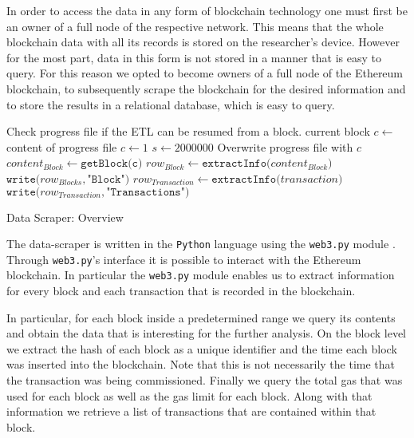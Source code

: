 In order to access the data in any form of blockchain technology one must first be an owner of a full node of the respective network. This means that the whole blockchain data with all its records is stored on the researcher's device. However for the most part, data in this form is not stored in a manner that is easy to query. For this reason we opted to become owners of a full node of the Ethereum blockchain, to subsequently scrape the blockchain for the desired information and to store the results in a relational database, which is easy to query.


\begin{algorithm}[h]
\label{etl}
\begin{algorithmic}
\State Check progress file if the ETL can be resumed from a block.
    \State current block $c \gets$ content of progress file
\Else
    \State $c \gets 1$
\EndIf
\State $s \gets 2000000$ 
   \State Overwrite progress file with $c$ 
   \State $content_{Block} \gets \texttt{getBlock(c)}$
   \State $row_{Block} \gets \texttt{extractInfo(}content_{Block}\texttt{)}$
   \State $\texttt{write(} row_{Blocks}, \texttt{"Block")}$
       \State $row_{Transaction} \gets \texttt{extractInfo(}transaction\texttt{)}$
       \State $\texttt{write(} row_{Transaction}, \texttt{"Transactions")}$
   \EndFor
\EndWhile
\end{algorithmic}
\caption{Data Scraper: Overview}
\end{algorithm}


The data-scraper is written in the \texttt{Python} language using the \texttt{web3.py} module \cite{Python, web3}. Through \texttt{web3.py}'s interface it is possible to interact with the Ethereum blockchain. In particular the \texttt{web3.py} module enables us to extract information for every block and each transaction that is recorded in the blockchain.

In particular, for each block inside a predetermined range we query its contents and obtain the data that is interesting for the further analysis. On the block level we extract the hash of each block as a unique identifier and the time each block was inserted into the blockchain. Note that this is not necessarily the time that the transaction was being commissioned. Finally we query the total gas that was used for each block as well as the gas limit for each block. Along with that information we retrieve a list of transactions that are contained within that block.

